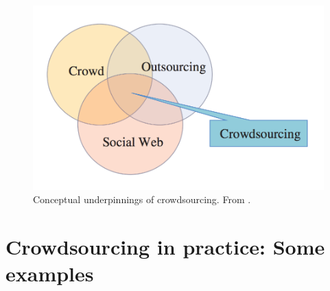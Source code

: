 \documentclass[letterpaper,10pt,pagesize=pdftex,headings=normal]{scrreprt}
\begin{document}
\begin{figure}[h]
\begin{center}
\includegraphics[scale=0.4]{figures/saxton13venn.png}
\caption{Conceptual underpinnings of crowdsourcing. From \citet{saxton2013}.}
\end{center}
\end{figure}

\chapter{Crowdsourcing in practice: Some examples}
\end{document}
